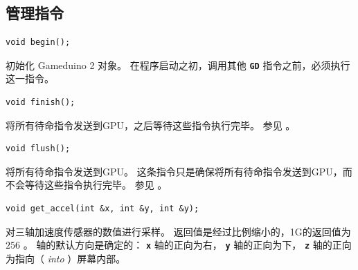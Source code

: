 \documentclass[10pt]{book}
\makeatletter
\newcommand{\gdtwo}{Gameduino 2 }
\newcommand{\mach}[1]{\texttt{\textbf{#1}}}
\newcommand{\cmdidx}[1]{
\index{#1@\mach{#1()}}
}
\newcommand{\cmd}[1]{\cmdidx{cmd\_#1}\nameref{cmd:#1}}
\makeatother
\begin{document}
\begin{CJK}{UTF8}{gkai}



\chapter{管理指令}


\begin{framed}
\begin{verbatim}
void begin();
\end{verbatim}
\end{framed}

初始化 \gdtwo 对象。
在程序启动之初，调用其他 \mach{GD} 指令之前，必须执行这一指令。


\begin{framed}
\begin{verbatim}
void finish();
\end{verbatim}
\end{framed}

将所有待命指令发送到GPU，之后等待这些指令执行完毕。
参见  。

\newpage
{}

\begin{framed}
\begin{verbatim}
void flush();
\end{verbatim}
\end{framed}

将所有待命指令发送到GPU。
这条指令只是确保将所有待命指令发送到GPU，而不会等待这些指令执行完毕。
参见  。


\begin{framed}
\begin{verbatim}
void get_accel(int &x, int &y, int &y);
\end{verbatim}
\end{framed}

对三轴加速度传感器的数值进行采样。
返回值是经过比例缩小的，1G的返回值为 $256$ 。
轴的默认方向是确定的： \mach{x} 轴的正向为右， \mach{y} 轴的正向为下， \mach{z} 轴的正向为指向（ \emph{into} ）屏幕内部。


\end{CJK}
\end{document}
